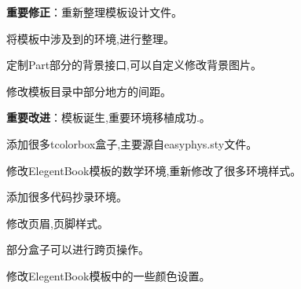 
\begin{change}
  \item \textbf{重要修正}：重新整理模板设计文件。
  \item 将模板中涉及到的环境,进行整理。
  \item 定制Part部分的背景接口,可以自定义修改背景图片。
  \item 修改模板目录中部分地方的间距。
\end{change}



\begin{change}
  \item \textbf{重要改进}：模板诞生,重要环境移植成功.。
  \item 添加很多tcolorbox盒子,主要源自easyphys.sty文件。
  \item 修改ElegentBook模板的数学环境,重新修改了很多环境样式。
  \item 添加很多代码抄录环境。
  \item 修改页眉,页脚样式。
  \item 部分盒子可以进行跨页操作。
  \item 修改ElegentBook模板中的一些颜色设置。
\end{change}

